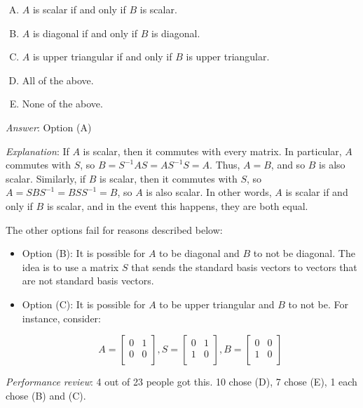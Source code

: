 \documentclass[10pt]{amsart}
\begin{document}
\begin{enumerate}
  \begin{enumerate}[(A)]
  \item $A$ is scalar if and only if $B$ is scalar.
  \item $A$ is diagonal if and only if $B$ is diagonal.
  \item $A$ is upper triangular if and only if $B$ is upper triangular.
  \item All of the above.
  \item None of the above.
  \end{enumerate}

  {\em Answer}: Option (A)

  {\em Explanation}: If $A$ is scalar, then it commutes with every
  matrix. In particular, $A$ commutes with $S$, so $B = S^{-1}AS =
  AS^{-1}S = A$. Thus, $A = B$, and so $B$ is also scalar. Similarly,
  if $B$ is scalar, then it commutes with $S$, so $A = SBS^{-1} =
  BSS^{-1} = B$, so $A$ is also scalar. In other words, $A$ is scalar
  if and only if $B$ is scalar, and in the event this happens, they
  are both equal.

  The other options fail for reasons described below:

  \begin{itemize}
  \item Option (B): It is possible for $A$ to be diagonal and $B$ to not
    be diagonal. The idea is to use a matrix $S$ that sends the
    standard basis vectors to vectors that are not standard basis
    vectors.
  \item Option (C): It is possible for $A$ to be upper triangular and $B$ to not
    be. For instance, consider:

    $$A = \left[ \begin{matrix} 0 & 1 \\ 0 & 0 \\\end{matrix} \right], S = \left[ \begin{matrix} 0 & 1 \\ 1 & 0 \\\end{matrix}\right], B = \left[ \begin{matrix} 0 & 0 \\ 1 & 0 \\\end{matrix} \right]$$
  \end{itemize}

  {\em Performance review}: 4 out of 23 people got this. 10 chose (D),
  7 chose (E), 1 each chose (B) and (C).


\end{enumerate}
\end{document}
